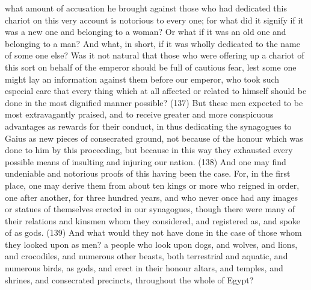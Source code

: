 what amount of accusation he brought against those who had dedicated this chariot on this very
account is notorious to every one; for what did it signify if it was a new one and belonging to a
woman? Or what if it was an old one and belonging to a man? And what, in short, if it was wholly
dedicated to the name of some one else? Was it not natural that those who were offering up a
chariot of this sort on behalf of the emperor should be full of cautious fear, lest some one might lay
an information against them before our emperor, who took such especial care that every thing
which at all affected or related to himself should be done in the most dignified manner possible?
(137) But these men expected to be most extravagantly praised, and to receive greater and more
conspicuous advantages as rewards for their conduct, in thus dedicating the synagogues to Gaius
as new pieces of consecrated ground, not because of the honour which was done to him by this
proceeding, but because in this way they exhausted every possible means of insulting and injuring
our nation. (138) And one may find undeniable and notorious proofs of this having been the case.
For, in the first place, one may derive them from about ten kings or more who reigned in order, one
after another, for three hundred years, and who never once had any images or statues of
themselves erected in our synagogues, though there were many of their relations and kinsmen
whom they considered, and registered as, and spoke of as gods. (139) And what would they not
have done in the case of those whom they looked upon as men? a people who look upon dogs,
and wolves, and lions, and crocodiles, and numerous other beasts, both terrestrial and aquatic,
and numerous birds, as gods, and erect in their honour altars, and temples, and shrines, and
consecrated precincts, throughout the whole of Egypt?

